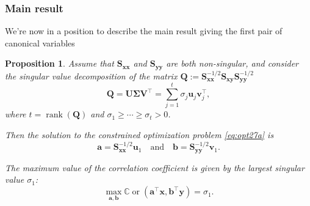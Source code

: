 \documentclass[
]{book}
\newtheorem{proposition}{Proposition}[chapter]
\theoremstyle{definition}
\theoremstyle{definition}
\theoremstyle{definition}
\theoremstyle{definition}
\theoremstyle{remark}
\begin{document}
\subsubsection*{Main result}\label{main-result}

We're now in a position to describe the main result giving the first pair of canonical variables

\begin{proposition}
\protect\hypertarget{prp:unnamed-chunk-2}{}\label{prp:unnamed-chunk-2}Assume that \(\mathbf S_{\mathbf x\mathbf x}\) and \(\mathbf S_{\mathbf y\mathbf y}\) are both non-singular, and consider the singular value decomposition of the matrix \(\mathbf Q:=\mathbf S_{\mathbf x\mathbf x}^{-1/2} \mathbf S_{\mathbf x\mathbf y}\mathbf S_{\mathbf y\mathbf y}^{-1/2}\)
\begin{equation}
\mathbf Q= {\mathbf U}{\pmb \Sigma} {\mathbf V}^\top = \sum_{j=1}^t \sigma_j {\mathbf u}_j {\mathbf v}_j^\top,
\label{eq:svdcca}
\end{equation}
where \(t=\operatorname{rank}(\mathbf Q)\) and \(\sigma_1 \geq \cdots \geq \sigma_t >0\).

Then the solution to the constrained optimization problem \eqref{eq:opt27a} is \[\mathbf a=\mathbf S_{\mathbf x\mathbf x}^{-1/2}{\mathbf u}_1\quad \mbox{and}\quad \mathbf b=\mathbf S_{\mathbf y\mathbf y}^{-1/2}{\mathbf v}_1.\]

The maximum value of the correlation coefficient is given by the largest singular value \(\sigma_1\):
\[\max_{\mathbf a, \mathbf b} {\mathbb{C}\operatorname{or}}(\mathbf a^\top\mathbf x, \mathbf b^\top\mathbf y)=\sigma_1.\]
\end{proposition}
\end{document}
